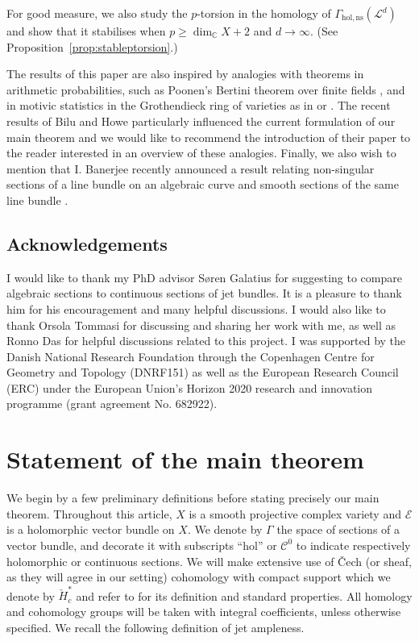 \documentclass[a4paper]{amsart}
\newcommand{\bC}{\mathbb C}
\newcommand{\cE}{\mathcal E}
\newcommand{\cC}{\mathcal C}
\newcommand{\cL}{\mathcal L}
\theoremstyle{plain}
\theoremstyle{definition}
\newcommand{\CCH}{\check{H}_{c}}
\begin{document}
For good measure, we also study the $p$-torsion in the homology of $\Gamma_{\mathrm{hol,ns}}(\cL^d)$ and show that it stabilises when $p \geq \dim_\bC X + 2$ and $d \to \infty$. (See Proposition~\ref{prop:stableptorsion}.)

\bigskip

The results of this paper are also inspired by analogies with theorems in arithmetic probabilities, such as Poonen's Bertini theorem over finite fields \cite{poonen_bertini_2004}, and in motivic statistics in the Grothendieck ring of varieties as in \cite{vakil_discriminants_2015} or \cite{bilu_motivic_2019}. The recent results of Bilu and Howe particularly influenced the current formulation of our main theorem and we would like to recommend the introduction of their paper \cite{bilu_motivic_2019} to the reader interested in an overview of these analogies. Finally, we also wish to mention that I. Banerjee recently announced a result relating non-singular sections of a line bundle on an algebraic curve and smooth sections of the same line bundle \cite{banerjee_stable_2020}. 

\subsection{Acknowledgements}
I would like to thank my PhD advisor Søren Galatius for suggesting to compare algebraic sections to continuous sections of jet bundles. It is a pleasure to thank him for his encouragement and many helpful discussions. I would also like to thank Orsola Tommasi for discussing and sharing her work with me, as well as Ronno Das for helpful discussions related to this project. I was supported by the Danish National Research Foundation through the Copenhagen Centre for Geometry and Topology (DNRF151) as well as the European Research Council (ERC) under the European Union's Horizon 2020 research and innovation programme (grant agreement No. 682922).


\section{Statement of the main theorem}
\label{section:mainthm}

We begin by a few preliminary definitions before stating precisely our main theorem. Throughout this article, $X$ is a smooth projective complex variety and $\cE$ is a holomorphic vector bundle on $X$. We denote by $\Gamma$ the space of sections of a vector bundle, and decorate it with subscripts ``$\mathrm{hol}$'' or $\cC^0$ to indicate respectively holomorphic or continuous sections. We will make extensive use of \v{C}ech (or sheaf, as they will agree in our setting) cohomology with compact support which we denote by $\CCH^*$ and refer to \cite{bredon_sheaf_1997} for its definition and standard properties. All homology and cohomology groups will be taken with integral coefficients, unless otherwise specified. We recall the following definition of jet ampleness.
\end{document}
